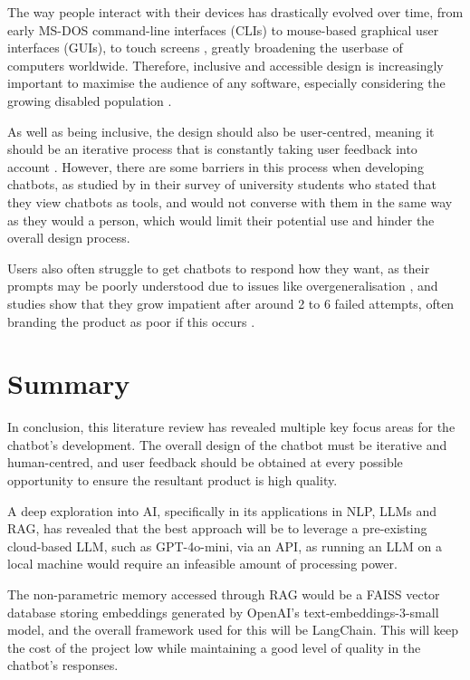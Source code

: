The way people interact with their devices has drastically evolved over time, from early MS-DOS command-line 
interfaces (CLIs) to mouse-based graphical user interfaces (GUIs), to touch screens \autocite{kotian_systematic_2024}, greatly broadening
the userbase of computers worldwide. Therefore, inclusive and accessible design is increasingly important to maximise the audience of any software,
especially considering the growing disabled population \autocite{putnam_how_2012}. 

As well as being inclusive, the design 
should also be user-centred, meaning it should be an iterative process that is constantly taking user feedback 
into account \autocite{chammas_closer_2015}. However, there are some barriers in this process when developing 
chatbots, as studied by \textcite{clark_what_2019} in their survey of university students who stated that they view 
chatbots as tools, and would not converse with them in the same way as they would a person, which would 
limit their potential use and hinder the overall design process. 

Users also often struggle to get chatbots to respond how they want, as their prompts may be poorly understood
due to issues like overgeneralisation \autocite{zamfirescu-pereira_why_2023}, and studies show that they
grow impatient after around 2 to 6 failed attempts, often branding the product as poor if this occurs \autocite{luger_like_2016}.

\section{Summary}

In conclusion, this literature review has revealed multiple key focus areas for the chatbot's development. 
The overall design of the chatbot must be iterative and human-centred, and user feedback should 
be obtained at every possible opportunity to ensure the resultant product is high quality.

A deep exploration into AI, specifically in its applications in NLP, LLMs and RAG, has revealed that the best approach 
will be to leverage a pre-existing cloud-based LLM, such as GPT-4o-mini, via an API, as running an LLM on a local machine would 
require an infeasible amount of processing power.

The non-parametric memory accessed through RAG would be a FAISS vector database storing embeddings generated by OpenAI's text-embeddings-3-small 
model, and the overall framework used for this will be LangChain. This will keep the cost of the project low while maintaining a good 
level of quality in the chatbot's responses.

